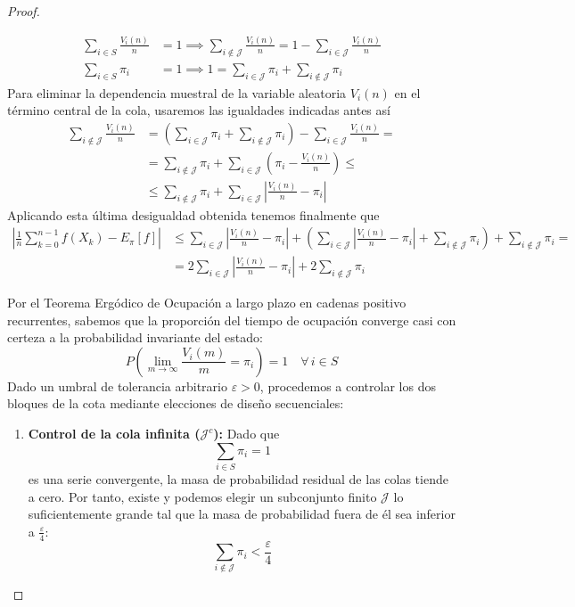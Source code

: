 \documentclass[10pt]{book}
\newcommand{\tbf}{\textbf}
\begin{document}
\begin{coro}
\begin{proof}
\begin{description}
        \begin{align*}
            \sum_{i \in S} \frac{V_i(n)}{n} &= 1 \implies\sum_{i \notin \mathcal{J}} \frac{V_i(n)}{n} = 1 - \sum_{i \in \mathcal{J}} \frac{V_i(n)}{n}\\
            \sum_{i \in S} \pi_i &= 1\implies 1 = \sum_{i \in \mathcal{J}} \pi_i + \sum_{i \notin \mathcal{J}} \pi_i
        \end{align*}
        Para eliminar la dependencia muestral de la variable aleatoria $V_i(n)$ en el término central de la cola, usaremos las igualdades indicadas antes así
        \begin{align*}
            \sum_{i \notin \mathcal{J}} \frac{V_i(n)}{n} &= \left( \sum_{i \in \mathcal{J}} \pi_i + \sum_{i \notin \mathcal{J}} \pi_i \right) - \sum_{i \in \mathcal{J}} \frac{V_i(n)}{n}=\\
            &=\sum_{i \notin \mathcal{J}} \pi_i + \sum_{i \in \mathcal{J}} \left( \pi_i - \frac{V_i(n)}{n} \right) \le \\ 
            &\le \sum_{i \notin \mathcal{J}} \pi_i + \sum_{i \in \mathcal{J}} \left| \frac{V_i(n)}{n} - \pi_i \right|
        \end{align*}
        Aplicando esta última desigualdad obtenida tenemos finalmente que
        \begin{align*}
            \left| \frac{1}{n} \sum_{k=0}^{n-1} f(X_k) - E_{\pi}[f] \right|&\le \sum_{i \in \mathcal{J}} \left| \frac{V_i(n)}{n} - \pi_i \right| + \left( \sum_{i \in \mathcal{J}} \left| \frac{V_i(n)}{n} - \pi_i \right| + \sum_{i \notin \mathcal{J}} \pi_i \right) + \sum_{i \notin \mathcal{J}} \pi_i= \\
            &= 2 \sum_{i \in \mathcal{J}} \left| \frac{V_i(n)}{n} - \pi_i \right| + 2 \sum_{i \notin \mathcal{J}} \pi_i
        \end{align*}
    \item[\tbf{Fase 2.}] Por el Teorema Ergódico de Ocupación a largo plazo en cadenas positivo recurrentes, sabemos que la proporción del tiempo de ocupación converge casi con certeza a la probabilidad invariante del estado:
        \[
        P\left(\lim_{m \to \infty} \frac{V_i(m)}{m} = \pi_i\right) = 1 \quad \forall \, i \in S
        \]
        Dado un umbral de tolerancia arbitrario $\varepsilon > 0$, procedemos a controlar los dos bloques de la cota mediante elecciones de diseño secuenciales:

        \begin{enumerate}
            \item \textbf{Control de la cola infinita ($\mathcal{J}^c$):} Dado que 
            $$\sum_{i \in S} \pi_i = 1$$ 
            es una serie convergente, la masa de probabilidad residual de las colas tiende a cero. Por tanto, existe y podemos elegir un subconjunto finito $\mathcal{J}$ lo suficientemente grande tal que la masa de probabilidad fuera de él sea inferior a $\frac{\varepsilon}{4}$:
            \[
            \sum_{i \notin \mathcal{J}} \pi_i < \frac{\varepsilon}{4}
            \]
            

\end{enumerate}
\end{description}
\end{proof}
\end{coro}
\end{document}
